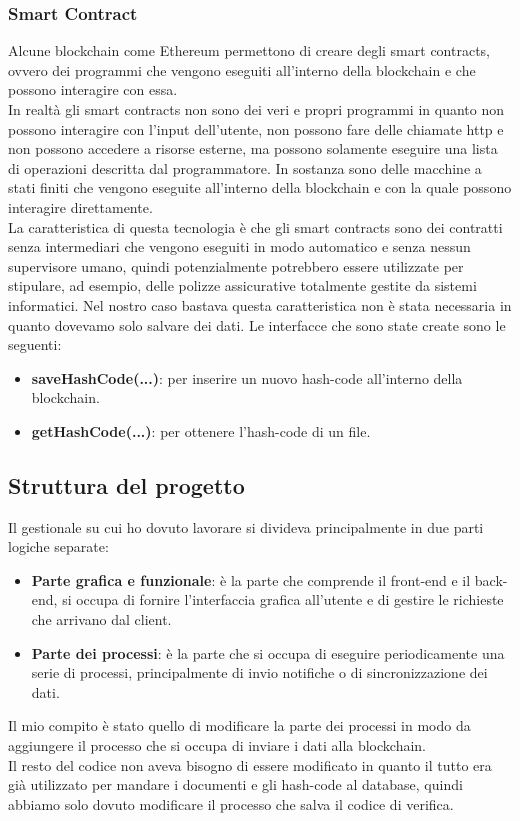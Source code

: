 \subsubsection{Smart Contract}
Alcune blockchain come Ethereum permettono di creare degli smart contracts,
ovvero dei programmi che vengono eseguiti all'interno della blockchain e che
possono interagire con essa. \\
In realtà gli smart contracts non sono dei veri e propri programmi in quanto
non possono interagire con l'input dell'utente, non possono fare delle chiamate
http e non possono accedere a risorse esterne, ma possono solamente eseguire
una lista di operazioni descritta dal programmatore. In sostanza sono delle
macchine a stati finiti che vengono eseguite all'interno della blockchain e con
la quale possono interagire direttamente. \\
La caratteristica di questa tecnologia è che gli smart contracts sono dei 
contratti senza intermediari che vengono eseguiti in modo automatico e senza 
nessun supervisore umano, quindi potenzialmente potrebbero essere utilizzate
per stipulare, ad esempio, delle polizze assicurative totalmente gestite
da sistemi informatici. Nel nostro caso bastava questa caratteristica non è
stata necessaria in quanto dovevamo solo salvare dei dati.
Le interfacce che sono state create sono le seguenti:
\begin{itemize}
    \item \textbf{saveHashCode(...)}: per inserire un nuovo hash-code
        all'interno della blockchain. 
    \item \textbf{getHashCode(...)}: per ottenere l'hash-code di un file.
\end{itemize}

\newpage

\subsection{Struttura del progetto}
Il gestionale su cui ho dovuto lavorare si divideva principalmente in due parti
logiche separate:
\begin{itemize}
    \item \textbf{Parte grafica e funzionale}: è la parte che comprende il
        front-end e il back-end, si occupa di fornire l'interfaccia grafica
        all'utente e di gestire le richieste che arrivano dal client.
    \item \textbf{Parte dei processi}: è la parte che si occupa di eseguire
        periodicamente una serie di processi, principalmente di invio notifiche 
        o di sincronizzazione dei dati.
\end{itemize}
Il mio compito è stato quello di modificare la parte dei processi in modo da
aggiungere il processo che si occupa di inviare i dati alla blockchain. \\
Il resto del codice non aveva bisogno di essere modificato in quanto il tutto
era già utilizzato per mandare i documenti e gli hash-code al database, quindi
abbiamo solo dovuto modificare il processo che salva il codice di verifica.

